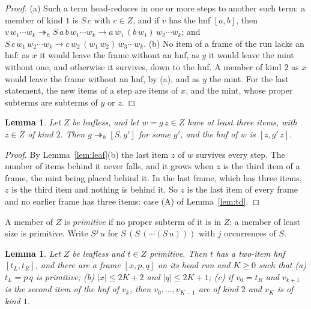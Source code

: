 \documentclass[11pt]{amsart}
\newtheorem{lemma}[theorem]{Lemma}
\newcommand{\hred}{\twoheadrightarrow_h}
\newcommand{\sz}[1]{\lvert#1\rvert}
\newcommand{\fr}[1]{[#1]}
\begin{document}
\begin{proof}
(a) Such a term head-reduces in one or more steps to another such term: a member of kind $1$ is
$S\,c$ with $c\in Z$, and if $v$ has the hnf $\fr{a,b}$, then $v\,w_1\cdots w_k\hred S\,a\,b\,w_1\cdots w_k\to a\,w_1\,(b\,w_1)\,w_2\cdots w_k$;
and $S\,c\,w_1\,w_2\cdots w_k\to c\,w_2\,(w_1\,w_2)\,w_3\cdots w_k$.
(b) No item of a frame of the run lacks an hnf: as $x$ it would leave the frame without an hnf, as
$y$ it would leave the mint without one, and otherwise it survives, down to the hnf. A member of
kind $2$ as $x$ would leave the frame without an hnf, by (a), and as $y$ the mint. For the last
statement, the new items of a step are items of $x$, and the mint, whose proper subterms are
subterms of $y$ or $z$.
\end{proof}

\begin{lemma}\label{lem:survive}
Let $Z$ be leafless, and let $w=g\,z\in Z$ have at least three items, with $z\in Z$ of kind $2$.
Then $g\hred\fr{S,g'}$ for some $g'$, and the hnf of $w$ is $\fr{z,g'\,z}$.
\end{lemma}

\begin{proof}
By Lemma~\ref{lem:leaf}(b) the last item $z$ of $w$ survives every step. The number of items
behind it never falls, and it grows when $z$ is the third item of a frame, the mint being placed
behind it. In the last frame, which has three items, $z$ is the third item and nothing is behind
it. So $z$ is the last item of every frame and no earlier frame has three items: case (A) of
Lemma~\ref{lem:td}.
\end{proof}

A member of $Z$ is \emph{primitive} if no proper subterm of it is in $Z$; a member of least size
is primitive. Write $S^j\,u$ for $S\,(S\,(\cdots(S\,u)))$ with $j$ occurrences of $S$.

\begin{lemma}\label{lem:prim}
Let $Z$ be leafless and $t\in Z$ primitive. Then $t$ has a two-item hnf $\fr{t_L,t_R}$, and there
are a frame $\fr{x,p,q}$ on its head run and $K\ge0$ such that \textup{(a)} $t_L=p\,q$ is
primitive; \textup{(b)} $\sz x\le2K+2$ and $\sz q\le2K+1$; \textup{(c)} if $v_0=t_R$ and $v_{k+1}$ is
the second item of the hnf of $v_k$, then $v_0,\dots,v_{K-1}$ are of kind $2$ and $v_K$ is of
kind $1$.
\end{lemma}
\end{document}
